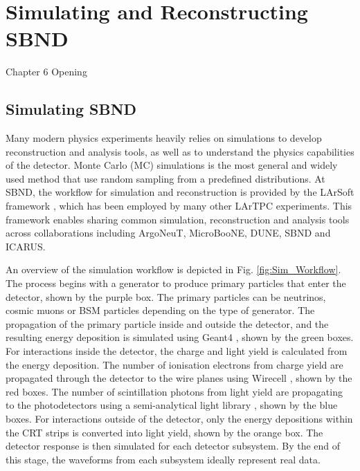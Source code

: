 
\chapter{Simulating and Reconstructing SBND}
\label{Chapter6}

\ifpdf
    \graphicspath{{Chapter6/Figs/Raster/}{Chapter6/Figs/PDF/}{Chapter6/Figs/}}
\else
    \graphicspath{{Chapter6/Figs/Vector/}{Chapter6/Figs/}}
\fi


Chapter 6 Opening

\newpage

\section{Simulating SBND}

Many modern physics experiments heavily relies on simulations to develop reconstruction and analysis tools, as well as to understand the physics capabilities of the detector.
Monte Carlo (MC) simulations is the most general and widely used method that use random sampling from a predefined distributions. 
At SBND, the workflow for simulation and reconstruction is provided by the LArSoft framework \cite{}, which has been employed by many other LArTPC experiments.
This framework enables sharing common simulation, reconstruction and analysis tools across collaborations including ArgoNeuT, MicroBooNE, DUNE, SBND and ICARUS.

An overview of the simulation workflow is depicted in Fig. \ref{fig:Sim_Workflow}.
The process begins with a generator to produce primary particles that enter the detector, shown by the purple box.
The primary particles can be neutrinos, cosmic muons or BSM particles depending on the type of generator.
The propagation of the primary particle inside and outside the detector, and the resulting energy deposition is simulated using Geant4 \cite{}, shown by the green boxes.
For interactions inside the detector, the charge and light yield is calculated from the energy deposition.
The number of ionisation electrons from charge yield are propagated through the detector to the wire planes using Wirecell \cite{}, shown by the red boxes.
The number of scintillation photons from light yield are propagating to the photodetectors using a semi-analytical light library \cite{}, shown by the blue boxes.
For interactions outside of the detector, only the energy depositions within the CRT strips is converted into light yield, shown by the orange box.
The detector response is then simulated for each detector subsystem.
By the end of this stage, the waveforms from each subsystem ideally represent real data.

